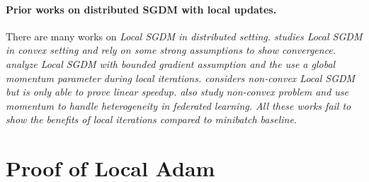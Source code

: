 \documentclass{article} %
\numberwithin{equation}{section}
\begin{document}
\paragraph{Prior works on distributed SGDM with local updates.}
There are many works on \em Local \em SGDM in distributed setting. 
\cite{liu2020accelerating} studies \em Local \em SGDM in convex setting and rely on some strong assumptions to show convergence. 
\cite{xu2021fedcm} analyze \em Local \em SGDM with bounded gradient assumption and the use a global momentum parameter during local iterations.
\cite{yu2019linear} considers non-convex \em Local \em SGDM but is only able to prove linear speedup.
\cite{wang2019slowmo, cheng2023momentum} also study non-convex problem and use momentum to handle heterogeneity in federated learning.
All these works fail to show the benefits of local iterations compared to minibatch baseline.


\section{Proof of Local Adam}\label{app:sec:local_adam}
\end{document}
